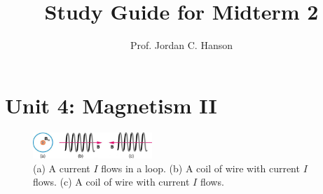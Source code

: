\documentclass[12pt,twocolumn]{article}
\title{Study Guide for Midterm 2}
\author{Prof. Jordan C. Hanson}
\begin{document}
\maketitle
\small

\section{Unit 4: Magnetism II}

\begin{figure}
\centering
\includegraphics[width=0.4\textwidth]{b-field_1.jpeg}
\caption{\label{fig:B-flux} \small (a) A current $I$ flows in a loop. (b) A coil of wire with current $I$ flows.  (c) A coil of wire with current $I$ flows.}
\end{figure}
\end{document}
